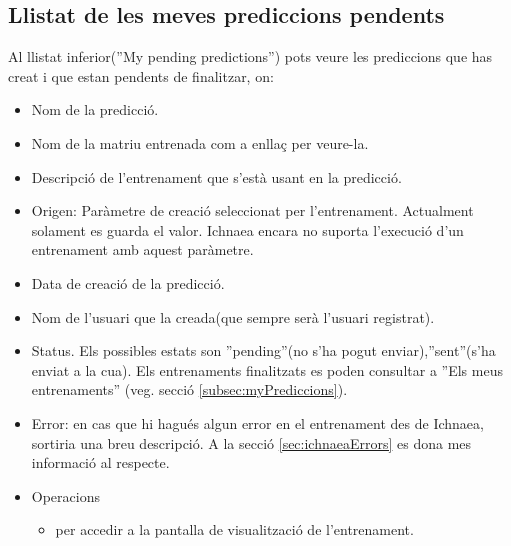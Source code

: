 \subsection{Llistat de les meves prediccions pendents}
Al llistat inferior(''My pending predictions'') pots veure les prediccions que has creat i que estan pendents de finalitzar, on: 
\begin{itemize}
\item Nom de la predicció.
\item Nom de la matriu entrenada com a enllaç per veure-la.
\item Descripci\'{o} de l'entrenament que s'est\`{a} usant en la predicció.
\item Origen: Paràmetre de creació seleccionat per l'entrenament. Actualment solament es guarda el valor. Ichnaea encara no suporta l'execució d'un entrenament amb aquest paràmetre.
\item Data de creaci\'{o} de la predicció.
\item Nom de l'usuari que la creada(que sempre serà l'usuari registrat).
\item Status. Els possibles estats son ''pending''(no s'ha pogut enviar),''sent''(s'ha enviat a la cua). Els entrenaments finalitzats es poden consultar a ''Els meus entrenaments'' (veg. secció \ref{subsec:myPrediccions}).
\item Error: en cas que hi hagués algun error en el entrenament des de Ichnaea, sortiria una breu descripció. A la secció \ref{sec:ichnaeaErrors} es dona mes informació al respecte.
\item Operacions
 \begin{itemize}
 \item \iconeyeopen per accedir a la pantalla de visualització de l'entrenament.
 \end{itemize}
\end{itemize}

